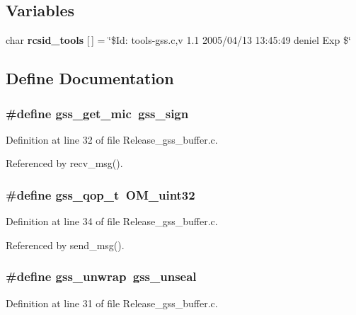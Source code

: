 \subsection*{Variables}
\begin{CompactItemize}
\item 
char {\bf rcsid\_\-tools} [$\,$] = \char`\"{}\$Id: tools-gss.c,v 1.1 2005/04/13 13:45:49 deniel Exp \$\char`\"{}
\end{CompactItemize}


\subsection{Define Documentation}
\subsubsection{\setlength{\rightskip}{0pt plus 5cm}\#define gss\_\-get\_\-mic\ gss\_\-sign}\label{Release__gss__buffer_8c_a2}




Definition at line 32 of file Release\_\-gss\_\-buffer.c.

Referenced by recv\_\-msg().
\subsubsection{\setlength{\rightskip}{0pt plus 5cm}\#define gss\_\-qop\_\-t\ OM\_\-uint32}\label{Release__gss__buffer_8c_a4}




Definition at line 34 of file Release\_\-gss\_\-buffer.c.

Referenced by send\_\-msg().
\subsubsection{\setlength{\rightskip}{0pt plus 5cm}\#define gss\_\-unwrap\ gss\_\-unseal}\label{Release__gss__buffer_8c_a1}




Definition at line 31 of file Release\_\-gss\_\-buffer.c.

